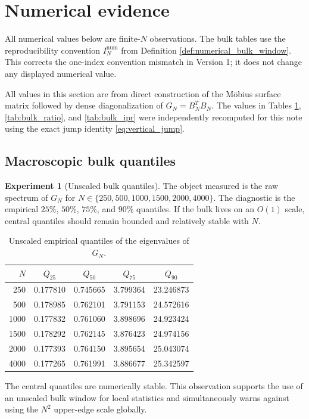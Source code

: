 \documentclass[11pt]{amsart}
\numberwithin{equation}{section}
\theoremstyle{plain}
\theoremstyle{definition}
\newtheorem{experiment}[theorem]{Experiment}
\theoremstyle{remark}
\begin{document}
\section{Numerical evidence}
\label{sec:numerical_evidence}

All numerical values below are finite-$N$ observations.  The bulk tables use the reproducibility convention $I_N^{\mathrm{num}}$ from Definition \ref{def:numerical_bulk_window}.  This corrects the one-index convention mismatch in Version 1; it does not change any displayed numerical value.

All values in this section are from direct construction of the M\"obius surface matrix followed by dense diagonalization of $G_N=B_N^TB_N$.  The values in Tables \ref{tab:bulk_quantiles}, \ref{tab:bulk_ratio}, and \ref{tab:bulk_ipr} were independently recomputed for this note using the exact jump identity \eqref{eq:vertical_jump}.

\subsection{Macroscopic bulk quantiles}
\label{subsec:bulk_quantiles}

\begin{experiment}[Unscaled bulk quantiles]
\label{exp:bulk_quantiles}
The object measured is the raw spectrum of $G_N$ for $N\in\{250,500,1000,1500,2000,4000\}$.  The diagnostic is the empirical $25\%$, $50\%$, $75\%$, and $90\%$ quantiles.  If the bulk lives on an $O(1)$ scale, central quantiles should remain bounded and relatively stable with $N$.

\begin{table}[htbp]
\centering
\caption{Unscaled empirical quantiles of the eigenvalues of $G_N$.}
\label{tab:bulk_quantiles}
\begin{tabular}{rcccc}
\toprule
$N$ & $Q_{25}$ & $Q_{50}$ & $Q_{75}$ & $Q_{90}$\\
\midrule
250  & 0.177810 & 0.745665 & 3.799364 & 23.246873\\
500  & 0.178985 & 0.762101 & 3.791153 & 24.572616\\
1000 & 0.177832 & 0.761060 & 3.898696 & 24.923424\\
1500 & 0.178292 & 0.762145 & 3.876423 & 24.974156\\
2000 & 0.177393 & 0.764150 & 3.895654 & 25.043074\\
4000 & 0.177265 & 0.761991 & 3.886677 & 25.342597\\
\bottomrule
\end{tabular}
\end{table}

The central quantiles are numerically stable.  This observation supports the use of an unscaled bulk window for local statistics and simultaneously warns against using the $N^2$ upper-edge scale globally.
\end{experiment}
\end{document}
